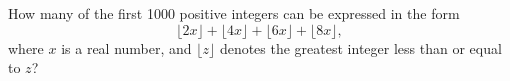How many of the first 1000 positive integers can be expressed in the form
\[ \lfloor 2x \rfloor + \lfloor 4x \rfloor + \lfloor 6x \rfloor + \lfloor 8x \rfloor, \]
where $x$ is a real number, and $\lfloor z \rfloor$ denotes the greatest integer less than or equal to $z$?